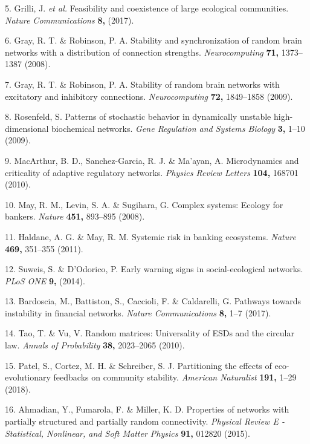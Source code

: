 \documentclass[]{article}
\begin{document}
\hypertarget{ref-Grilli2017}{}
5. Grilli, J. \emph{et al.} Feasibility and coexistence of large
ecological communities. \emph{Nature Communications} \textbf{8,} (2017).

\hypertarget{ref-Gray2008}{}
6. Gray, R. T. \& Robinson, P. A. Stability and synchronization of
random brain networks with a distribution of connection strengths.
\emph{Neurocomputing} \textbf{71,} 1373--1387 (2008).

\hypertarget{ref-Gray2009}{}
7. Gray, R. T. \& Robinson, P. A. Stability of random brain networks
with excitatory and inhibitory connections. \emph{Neurocomputing}
\textbf{72,} 1849--1858 (2009).

\hypertarget{ref-Rosenfeld2009}{}
8. Rosenfeld, S. Patterns of stochastic behavior in dynamically unstable
high-dimensional biochemical networks. \emph{Gene Regulation and Systems
Biology} \textbf{3,} 1--10 (2009).

\hypertarget{ref-MacArthur2010}{}
9. MacArthur, B. D., Sanchez-Garcia, R. J. \& Ma'ayan, A. Microdynamics
and criticality of adaptive regulatory networks. \emph{Physics Review
Letters} \textbf{104,} 168701 (2010).

\hypertarget{ref-May2008}{}
10. May, R. M., Levin, S. A. \& Sugihara, G. Complex systems: Ecology
for bankers. \emph{Nature} \textbf{451,} 893--895 (2008).

\hypertarget{ref-Haldane2011}{}
11. Haldane, A. G. \& May, R. M. Systemic risk in banking ecosystems.
\emph{Nature} \textbf{469,} 351--355 (2011).

\hypertarget{ref-Suweis2014}{}
12. Suweis, S. \& D'Odorico, P. Early warning signs in social-ecological
networks. \emph{PLoS ONE} \textbf{9,} (2014).

\hypertarget{ref-Bardoscia2017}{}
13. Bardoscia, M., Battiston, S., Caccioli, F. \& Caldarelli, G.
Pathways towards instability in financial networks. \emph{Nature
Communications} \textbf{8,} 1--7 (2017).

\hypertarget{ref-Tao2010}{}
14. Tao, T. \& Vu, V. Random matrices: Universality of ESDs and the
circular law. \emph{Annals of Probability} \textbf{38,} 2023--2065
(2010).

\hypertarget{ref-Patel2018}{}
15. Patel, S., Cortez, M. H. \& Schreiber, S. J. Partitioning the
effects of eco-evolutionary feedbacks on community stability.
\emph{American Naturalist} \textbf{191,} 1--29 (2018).

\hypertarget{ref-Ahmadian2015}{}
16. Ahmadian, Y., Fumarola, F. \& Miller, K. D. Properties of networks
with partially structured and partially random connectivity.
\emph{Physical Review E - Statistical, Nonlinear, and Soft Matter
Physics} \textbf{91,} 012820 (2015).
\end{document}
